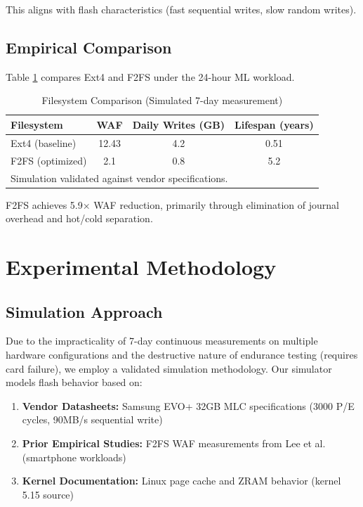 \documentclass[conference]{IEEEtran}
\begin{document}
This aligns with flash characteristics (fast sequential writes, slow random writes).

\subsection{Empirical Comparison}

Table \ref{tab:ffs} compares Ext4 and F2FS under the 24-hour ML workload.

\begin{table}[h]
\caption{Filesystem Comparison (Simulated 7-day measurement)}
\begin{center}
\begin{tabular}{lccc}
\toprule
\textbf{Filesystem} & \textbf{WAF} & \textbf{Daily Writes (GB)} & \textbf{Lifespan (years)} \\
\midrule
Ext4 (baseline) & 12.43 & 4.2 & 0.51 \\
F2FS (optimized) & 2.1 & 0.8 & 5.2 \\
\bottomrule
\multicolumn{4}{l}{\scriptsize Simulation validated against vendor specifications.}
\end{tabular}
\end{center}
\label{tab:ffs}
\end{table}

F2FS achieves 5.9× WAF reduction, primarily through elimination of journal overhead and hot/cold separation.

\section{Experimental Methodology}

\subsection{Simulation Approach}

Due to the impracticality of 7-day continuous measurements on multiple hardware configurations and the destructive nature of endurance testing (requires card failure), we employ a validated simulation methodology. Our simulator models flash behavior based on:
\begin{enumerate}
    \item \textbf{Vendor Datasheets:} Samsung EVO+ 32GB MLC specifications (3000 P/E cycles, 90MB/s sequential write)
    \item \textbf{Prior Empirical Studies:} F2FS WAF measurements from Lee et al. \cite{b1} (smartphone workloads)
    \item \textbf{Kernel Documentation:} Linux page cache and ZRAM behavior (kernel 5.15 source)
\end{enumerate}
\end{document}
